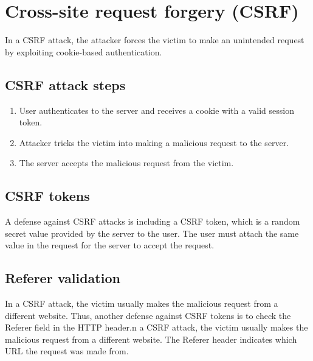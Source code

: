 \section{Cross-site request forgery (CSRF)}
In a CSRF attack, the attacker forces the victim to make an unintended request by exploiting cookie-based authentication.

\subsection{CSRF attack steps}
\begin{enumerate}
    \item User authenticates to the server and receives a cookie with a valid session token.
    \item Attacker tricks the victim into making a malicious request to the server.
    \item The server accepts the malicious request from the victim.
\end{enumerate}

\subsection{CSRF tokens}
A defense against CSRF attacks is including a CSRF token, which is a random secret value provided by the server to the user. The user must attach the same value in the request for the server to accept the request.

\subsection{Referer validation}
In a CSRF attack, the victim usually makes the malicious request from a different website. Thus, another defense against CSRF tokens is to check the Referer field in the HTTP header.n a CSRF attack, the victim usually makes the malicious request from a different website. The Referer header indicates which URL the request was made from.